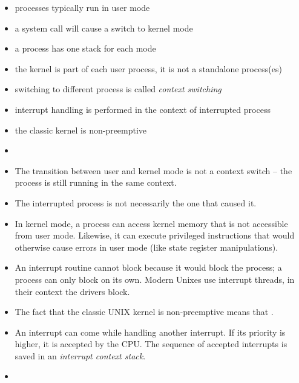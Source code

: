 
\begin{slide}
\begin{itemize}
\item processes typically run in user mode
\item a system call will cause a switch to kernel mode
\item a process has one stack for each mode
\item the kernel is part of each user process, it is not a standalone process(es)
\item switching to different process is called \emph{context switching}
\item interrupt handling is performed in the context of interrupted process
\item the classic kernel is non-preemptive
\end{itemize}
\end{slide}

\begin{itemize}
\item {}
\item The transition between user and kernel mode is not a context switch
-- the process is still running in the same context.
\item The interrupted process is not necessarily the one that caused it.
\item In kernel mode, a process can access kernel memory that is not accessible
from user mode. Likewise, it can execute privileged instructions that would
otherwise cause errors in user mode (like state register manipulations).
\item An interrupt routine cannot block because it would block the process;
a process can only block on its own. Modern Unixes use interrupt threads,
in their context the drivers  block.
\item The fact that the classic UNIX kernel is non-preemptive means that
.
\item An interrupt can come while handling another interrupt. If its priority
is higher, it is accepted by the CPU. The sequence of accepted interrupts is
saved in an \emph{interrupt context stack}.
\item {}
\end{itemize}

